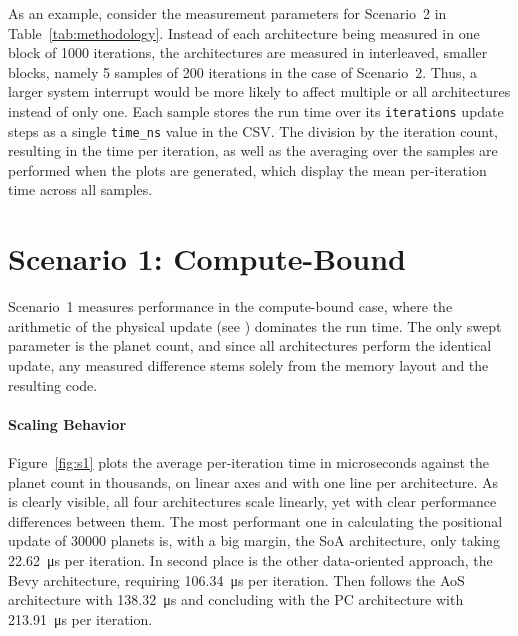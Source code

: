 As an example, consider the measurement parameters for Scenario~2 in Table~\ref{tab:methodology}. Instead of each architecture being measured in one block of \num{1000} iterations, the architectures are measured in interleaved, smaller blocks, namely \num{5} samples of \num{200} iterations in the case of Scenario~2. Thus, a larger system interrupt would be more likely to affect multiple or all architectures instead of only one. Each sample stores the run time over its \texttt{iterations} update steps as a single \texttt{time\_ns} value in the \ac{CSV}. The division by the iteration count, resulting in the time per iteration, as well as the averaging over the samples are performed when the plots are generated, which display the mean per-iteration time across all samples.

\section{Scenario 1: Compute-Bound}
\label{sec:evaluation:scenario1}
Scenario~1 measures performance in the compute-bound case, where the arithmetic of the physical update (see ) dominates the run time. The only swept parameter is the planet count, and since all architectures perform the identical update, any measured difference stems solely from the memory layout and the resulting code. 

\paragraph{Scaling Behavior}
Figure~\ref{fig:s1} plots the average per-iteration time in microseconds against the planet count in thousands, on linear axes and with one line per architecture. As is clearly visible, all four architectures scale linearly, yet with clear performance differences between them. The most performant one in calculating the positional update of \num{30000} planets is, with a big margin, the \ac{SoA} architecture, only taking \qty{22.62}{\micro\second} per iteration. In second place is the other data-oriented approach, the Bevy architecture, requiring \qty{106.34}{\micro\second} per iteration. Then follows the \ac{AoS} architecture with \qty{138.32}{\micro\second} and concluding with the \ac{PC} architecture with \qty{213.91}{\micro\second} per iteration.

